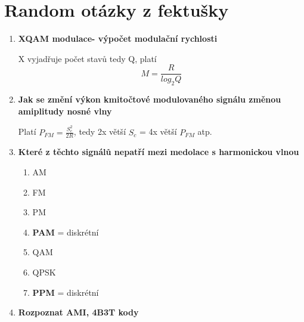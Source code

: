 \section{Random otázky z fektušky}
\begin{enumerate}
    \item \textbf{XQAM modulace- výpočet modulační rychlosti}
    
    X vyjadřuje počet stavů tedy Q, platí
    $$
    M=\frac{R}{log_2Q}
    $$
    \item \textbf{Jak se změní výkon kmitočtové modulovaného signálu změnou amiplitudy nosné vlny}
    
    Platí $P_{FM}=\frac{S_c^2}{2R}$, tedy 2x větší $S_c$ = 4x větší $P_{FM}$ atp. 
    \item \textbf{Které z těchto signálů nepatří mezi medolace s harmonickou vlnou}
    \begin{enumerate}
        \item AM
        \item FM
        \item PM
        \item \textbf{PAM} = diskrétní
        \item QAM
        \item QPSK
        \item \textbf{PPM} = diskrétní
    \end{enumerate}
    \item \textbf{Rozpoznat AMI, 4B3T kody}


\end{enumerate}
